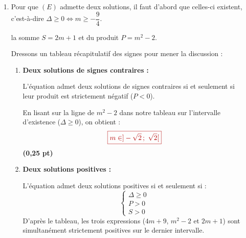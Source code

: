 \documentclass[12pt,a4paper]{article}
\newcommand{\redtitle}[1]{\textcolor{myred}{\textbf{#1}}}
\newcommand{\redbox}[1]{\color{myred}\boxed{#1}\color{black}}
\begin{document}
\begin{enumerate}
    En substituant l'expression de $m$ dans celle de $P$, on obtient :
    \[ P = \left(\dfrac{S - 1}{2}\right)^2 - 2 \iff P = \dfrac{S^2 - 2S + 1}{4} - 2 \]
    \[ 4P = S^2 - 2S + 1 - 8 \iff S^2 - 2S - 4P - 7 = 0 \]
    
    En remplaçant par $x'$ et $x''$, la relation indépendante de $m$ est :
    \[ \redbox{(x' + x'')^2 - 2(x' + x'') - 4x'x'' - 7 = 0} \] \hfill \textbf{(0,5 pt)}
    
    \item Pour que $(E)$ admette deux solutions, il faut d'abord que celles-ci existent, c'est-à-dire $\Delta \geq 0 \iff m \geq -\dfrac{9}{4}$.

la somme $S = 2m+1$ et du produit $P = m^2-2$.
    
    Dressons un tableau récapitulatif des signes pour mener la discussion :
    
    \begin{center}
    \end{center}
    
    \begin{enumerate}
        \item \redtitle{Deux solutions de signes contraires :}
        
        L'équation admet deux solutions de signes contraires si et seulement si leur produit est strictement négatif ($P < 0$). 
        
        En lisant sur la ligne de $m^2-2$ dans notre tableau sur l'intervalle d'existence ($\Delta \geq 0$), on obtient :
        \[ \redbox{m \in ]-\sqrt{2} \,;~ \sqrt{2}[} \] \hfill \textbf{(0,25 pt)}
        
        \item \redtitle{Deux solutions positives :}
        
        L'équation admet deux solutions positives si et seulement si :
        \[ \begin{cases} \Delta \geq 0 \\ P > 0 \\ S > 0 \end{cases} \]
        D'après le tableau, les trois expressions ($4m+9$, $m^2-2$ et $2m+1$) sont simultanément strictement positives sur le dernier intervalle.
        

\end{enumerate}
\end{enumerate}
\end{document}
